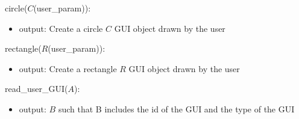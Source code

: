 \documentclass[12pt, titlepage]{article}
\begin{document}
\noindent circle($C$(user{\_}param)):
\begin{itemize}
\item output: Create a circle $C$ GUI object drawn by the user 
\end{itemize}

\noindent rectangle($R$(user{\_}param)):
\begin{itemize}
\item output: Create a rectangle $R$ GUI object drawn by the user 
\end{itemize}

\noindent read{\_}user{\_}GUI($A$):
\begin{itemize}
\item output:  $B$ such that B includes the id of the GUI and the type of the 
GUI
\end{itemize}
\bigskip

\newpage



\end{document}
